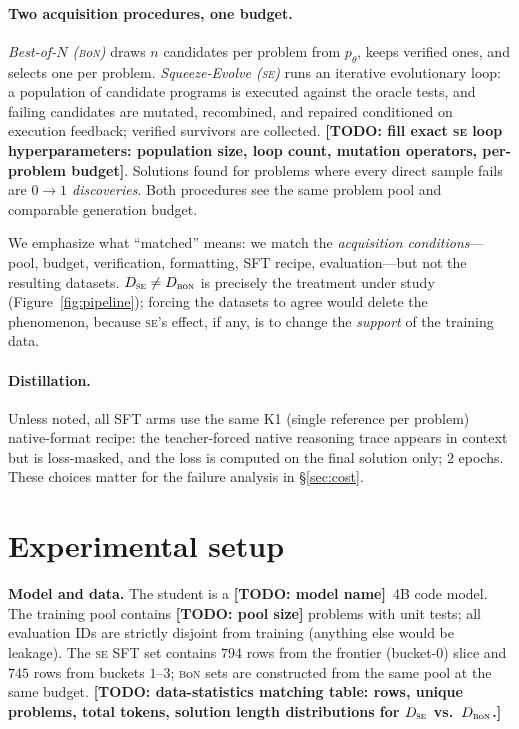\documentclass{article}
\newcommand{\todo}[1]{\textcolor{orange!75!black}{\textbf{[TODO: #1]}}}
\newcommand{\se}{\textnormal{\textsc{se}}}
\newcommand{\bon}{\textnormal{\textsc{b}o\textsc{n}}}
\begin{document}
\paragraph{Two acquisition procedures, one budget.}
\emph{Best-of-$N$ (\bon{})} draws $n$ candidates per problem from $p_\theta$, keeps verified ones, and selects one per problem. \emph{Squeeze-Evolve (\se{})} runs an iterative evolutionary loop: a population of candidate programs is executed against the oracle tests, and failing candidates are mutated, recombined, and repaired conditioned on execution feedback; verified survivors are collected. \todo{fill exact \se{} loop hyperparameters: population size, loop count, mutation operators, per-problem budget}. Solutions found for problems where every direct sample fails are \emph{$0{\to}1$ discoveries}. Both procedures see the same problem pool and comparable generation budget.

We emphasize what ``matched'' means: we match the \emph{acquisition conditions}---pool, budget, verification, formatting, SFT recipe, evaluation---but not the resulting datasets. $D_{\se{}} \neq D_{\bon{}}$ is precisely the treatment under study (Figure~\ref{fig:pipeline}); forcing the datasets to agree would delete the phenomenon, because \se{}'s effect, if any, is to change the \emph{support} of the training data.

\paragraph{Distillation.}
Unless noted, all SFT arms use the same K1 (single reference per problem) native-format recipe: the teacher-forced native reasoning trace appears in context but is loss-masked, and the loss is computed on the final solution only; $2$ epochs. These choices matter for the failure analysis in \S\ref{sec:cost}.

\section{Experimental setup}
\label{sec:setup}

\textbf{Model and data.} The student is a \todo{model name}~4B code model. The training pool contains \todo{pool size} problems with unit tests; all evaluation IDs are strictly disjoint from training (anything else would be leakage). The \se{} SFT set contains $794$ rows from the frontier (bucket-$0$) slice and $745$ rows from buckets $1$--$3$; \bon{} sets are constructed from the same pool at the same budget. \todo{data-statistics matching table: rows, unique problems, total tokens, solution length distributions for $D_{\se}$ vs.\ $D_{\bon}$.}
\end{document}
